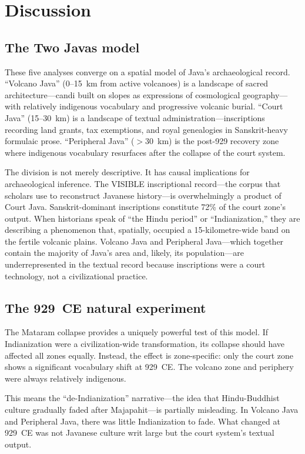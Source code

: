 \documentclass[12pt]{article}
\begin{document}
\section{Discussion}

\subsection{The Two Javas model}

These five analyses converge on a spatial model of Java's archaeological record.
``Volcano Java'' (0--15~km from active volcanoes) is a landscape of sacred architecture---candi built on slopes as expressions of cosmological geography---with relatively indigenous vocabulary and progressive volcanic burial.
``Court Java'' (15--30~km) is a landscape of textual administration---inscriptions recording land grants, tax exemptions, and royal genealogies in Sanskrit-heavy formulaic prose.
``Peripheral Java'' ($>$30~km) is the post-929 recovery zone where indigenous vocabulary resurfaces after the collapse of the court system.

The division is not merely descriptive.
It has causal implications for archaeological inference.
The VISIBLE inscriptional record---the corpus that scholars use to reconstruct Javanese history---is overwhelmingly a product of Court Java.
Sanskrit-dominant inscriptions constitute 72\% of the court zone's output.
When historians speak of ``the Hindu period'' or ``Indianization,'' they are describing a phenomenon that, spatially, occupied a 15-kilometre-wide band on the fertile volcanic plains.
Volcano Java and Peripheral Java---which together contain the majority of Java's area and, likely, its population---are underrepresented in the textual record because inscriptions were a court technology, not a civilizational practice.

\subsection{The 929~CE natural experiment}

The Mataram collapse provides a uniquely powerful test of this model.
If Indianization were a civilization-wide transformation, its collapse should have affected all zones equally.
Instead, the effect is zone-specific: only the court zone shows a significant vocabulary shift at 929~CE.
The volcano zone and periphery were always relatively indigenous.

This means the ``de-Indianization'' narrative---the idea that Hindu-Buddhist culture gradually faded after Majapahit---is partially misleading.
In Volcano Java and Peripheral Java, there was little Indianization to fade.
What changed at 929~CE was not Javanese culture writ large but the court system's textual output.
\end{document}

